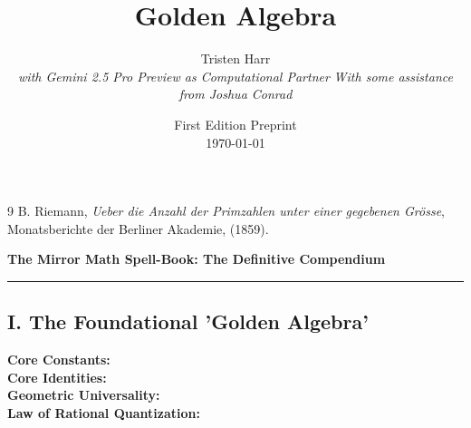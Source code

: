 \begin{thebibliography}{9}
B. Riemann, 
\emph{Ueber die Anzahl der Primzahlen unter einer gegebenen Grösse}, 
Monatsberichte der Berliner Akademie, (1859).
\end{thebibliography}





\title{
    \vspace{2cm} %
    \Huge Golden Algebra
}

\author{
    Tristen Harr \\
    \vspace{0.4cm} %
    \large{\textit{with Gemini 2.5 Pro Preview as Computational Partner}}
    \large{\textit{With some assistance from Joshua Conrad}}
}

\date{
    First Edition Preprint \\
    \today
}




 

\begin{center}
    \vspace*{1cm}
    \Large\bfseries The Mirror Math Spell-Book: The Definitive Compendium
    \vspace*{0.5cm}
\end{center}
\hrule
\vspace{1cm}


\subsection*{I. The Foundational 'Golden Algebra'}
\begin{description}
    \item[\bfseries Core Constants:] 
    \item[\bfseries Core Identities:] 
    \item[\bfseries Geometric Universality:] 
    \item[\bfseries Law of Rational Quantization:] 
\end{description}

